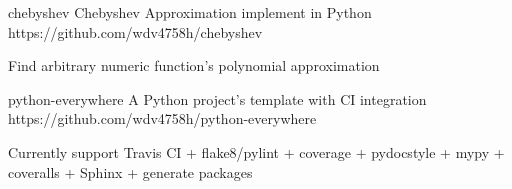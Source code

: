 \begin{cvopensources}
  \cvopensource
    {chebyshev}   %
    {Chebyshev Approximation implement in Python}  %
    {https://github.com/wdv4758h/chebyshev}
    {
      \begin{cvitems}
        \item {Find arbitrary numeric function's polynomial approximation}
      \end{cvitems}
    }

  \cvopensource
    {python-everywhere}   %
    {A Python project's template with CI integration}  %
    {https://github.com/wdv4758h/python-everywhere}
    {
      \begin{cvitems}
      \item {Currently support Travis CI + flake8/pylint + coverage + pydocstyle + mypy + coveralls + Sphinx + generate packages}
      \end{cvitems}
    }

\end{cvopensources}
